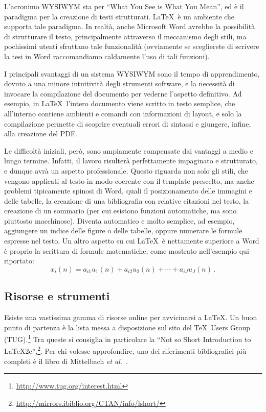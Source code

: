 \documentclass[12pt,italian]{report}
\begin{document}
L'acronimo WYSIWYM sta per ``What You See is What You Mean'', ed è il paradigma per la creazione di testi strutturati. \LaTeX\ è un ambiente che supporta tale paradigma. In realtà, anche Microsoft Word avrebbe la possibilità di strutturare il testo, principalmente attraverso il meccanismo degli stili, ma pochissimi utenti sfruttano tale funzionalità (ovviamente se sceglierete di scrivere la tesi in Word raccomandiamo caldamente l'uso di tali funzioni).

I principali svantaggi di un sistema WYSIWYM sono il tempo di apprendimento, dovuto a una minore intuitività degli strumenti software, e la necessità di invocare la compilazione del documento per vederne l'aspetto definitivo. Ad esempio, in \LaTeX\ l'intero documento viene scritto in testo semplice, che all'interno contiene ambienti e comandi con informazioni di layout, e solo la compilazione permette di scoprire eventuali errori di sintassi e giungere, infine, alla creazione del PDF. 

Le difficoltà iniziali, però, sono ampiamente compensate dai vantaggi a medio e lungo termine. Infatti, il lavoro risulterà perfettamente impaginato e strutturato, e dunque avrà un aspetto professionale. Questo riguarda non solo gli stili, che vengono applicati al testo in modo coerente con il template prescelto, ma anche problemi tipicamente spinosi di Word, quali il posizionamento delle immagini e delle tabelle, la creazione di una bibliografia con relative citazioni nel testo, la creazione di un sommario (per cui esistono funzioni automatiche, ma sono piuttosto macchinose). Diventa automatico e molto semplice, ad esempio, aggiungere un indice delle figure o delle tabelle, oppure numerare le formule espresse nel testo. Un altro aspetto su cui \LaTeX\ è nettamente superiore a Word è proprio la scrittura di formule matematiche, come mostrato nell'esempio qui riportato:
\begin{equation}
x_i(n) = a_{i1}u_1(n) + a_{i2}u_2(n) + \cdots + a_{iJ}u_J(n) \, .
\label{eq:multimix}
\end{equation}

\subsection{Risorse e strumenti}

Esiste una vastissima gamma di risorse online per avvicinarsi a \LaTeX. Un buon punto di partenza \`e la lista messa a disposizione sul sito del \TeX\ Users Group (TUG).\footnote{\url{http://www.tug.org/interest.html}}
Tra queste si consiglia in particolare la ``Not so Short Introduction to LaTeX2e'',\footnote{\url{http://mirrors.ibiblio.org/CTAN/info/lshort/}}. Per chi volesse approfondire, uno dei riferimenti bibliografici pi\`u completi \`e il libro di Mittelbach {\em et al.}~\cite{mittelbach2004latex}.
\end{document}
